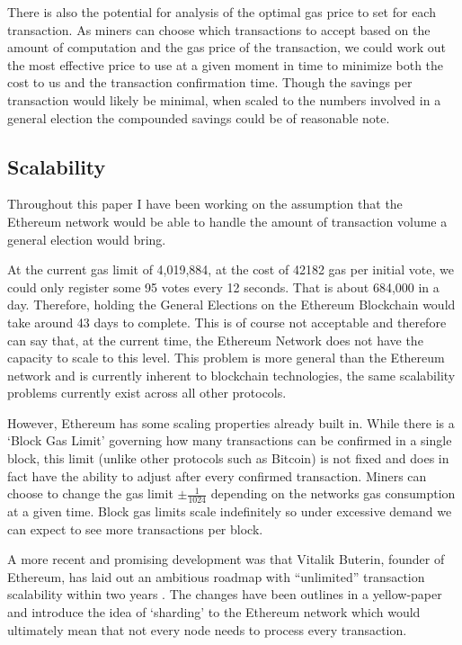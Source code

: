 \documentclass{article}
\begin{document}
	There is also the potential for analysis of the optimal gas price to set for each transaction. As miners can choose which transactions to accept based on the amount of computation and the gas price of the transaction, we could work out the most effective price to use at a given moment in time to minimize both the cost to us and the transaction confirmation time. Though the savings per transaction would likely be minimal, when scaled to the numbers involved in a general election the compounded savings could be of reasonable note.
	
		
	\clearpage
	\subsection{Scalability}
	Throughout this paper I have been working on the assumption that the Ethereum network would be able to handle the amount of transaction volume a general election would bring. 
	
	At the current gas limit of 4,019,884, at the cost of 42182 gas per initial vote, we could only register some 95 votes every 12 seconds. That is about 684,000 in a day. Therefore, holding the General Elections on the Ethereum Blockchain would take around 43 days to complete. This is of course not acceptable and therefore can say that, at the current time, the Ethereum Network does not have the capacity to scale to this level. This problem is more general than the Ethereum network and is currently inherent to blockchain technologies, the same scalability problems currently exist across all other protocols.
	
	However, Ethereum has some scaling properties already built in. While there is a `Block Gas Limit' governing how many transactions can be confirmed in a single block, this limit (unlike other protocols such as Bitcoin) is not fixed and does in fact have the ability to adjust after every confirmed transaction. Miners can choose to change the gas limit $\pm\frac{1}{1024}$ depending on the networks gas consumption at a given time. Block gas limits scale indefinitely \citep{73_wood_2017} so under excessive demand we can expect to see more transactions per block.
	
	A more recent and promising development was that Vitalik Buterin, founder of Ethereum, has laid out an ambitious roadmap with ``unlimited'' transaction scalability within two years \citep{74_ethereum_announces_unlimited_scalability_roadmap}. The changes have been outlines in a yellow-paper \citep{73_wood_2017} and introduce the idea of `sharding' to the Ethereum network which would ultimately mean that not every node needs to process every transaction. 
	
\end{document}
